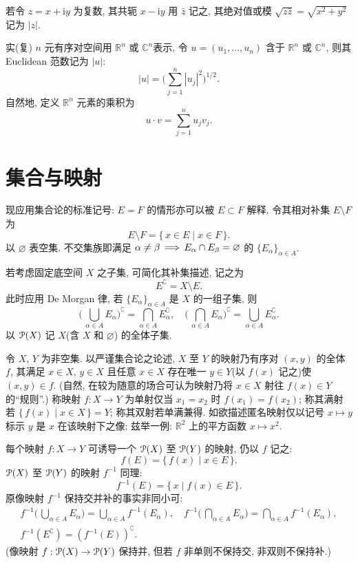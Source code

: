 \documentclass[twoside, fontset=fandol, punct=kaiming]{ctexbook}
\renewcommand\implies{\DOTSB \,\Longrightarrow \,}
\let \mathcal \EuScript
\theoremstyle{innocent}
\begin{document}
若令 $z=x+\mathrm iy$ 为复数, 其共轭 $x-\mathrm iy$ 用 $\bar z$ 记之, 其绝对值或模 $\sqrt{z\bar z} = \sqrt{x^2 + y^2}$ 记为 $|z|$.

实(复) $n$ 元有序对空间用 $\mathbb R^n$ 或 $\mathbb C^n$表示, 令 $u=(u_1,\dots,u_n)$ 含于 $\mathbb R^n$ 或 $\mathbb C^n$, 则其 Euclidean 范数记为 $|u|$:
\[
    |u| = \biggl( \sum_{j=1}^n |u_j|^2 \biggr) ^{1 /2}
    .\]
自然地, 定义 $\mathbb R^n$ 元素的乘积为
\[
    u\cdot v=\sum_{j=1}^n u_j v_j
    .\]
\section{集合与映射}
现应用集合论的标准记号: $E=F$ 的情形亦可以被 $E\subset F$ 解释, 令其相对补集 $E\setminus F$ 为
\[
    E\setminus F = \{\, x\in E \mid x\in F \,\}.
\]
以 $\varnothing$ 表空集. 不交集族即满足 $\alpha \neq \beta \implies E_\alpha\cap E_ \beta =\varnothing$ 的 $\{E_\alpha\}_{\alpha\in A}$.

若考虑固定底空间 $X$ 之子集, 可简化其补集描述, 记之为
\[
    E^\complement  = X\setminus E.
\]
此时应用 De Morgan 律, 若 $\{E_\alpha\}_{\alpha\in A}$ 是 $X$ 的一组子集, 则
\[
    \biggl(\, \bigcup_{\alpha\in A}E_\alpha \biggr)^\complement = \bigcap_{\alpha\in A}E_\alpha^\complement,\quad\biggl(\, \bigcap_{\alpha\in A}E_\alpha \biggr)^\complement = \bigcup_{\alpha\in A}E_\alpha^\complement.
\]
以 $\mathcal P(X)$ 记 $X$(含 $X$ 和 $\varnothing$) 的全体子集.

令 $X$, $Y$ 为非空集. 以严谨集合论之论述, $X$ 至 $Y$ 的映射乃有序对 $(x,y)$ 的全体 $f$, 其满足 $x\in X$, $y\in X$ 且任意 $x\in X$ 存在唯一 $y\in Y$(以 $f(x)$ 记之)使 $(x,y)\in f$. (自然, 在较为随意的场合可认为映射乃将 $x\in X$ 射往 $f(x)\in Y$ 的``规则''.) 称映射 $f:X\to Y$ 为单射仅当 $x_1=x_2$ 时 $f(x_1)=f(x_2)$; 称其满射若 $\{\,f(x)\mid x\in X\,\}=Y$; 称其双射若单满兼得. 如欲描述匿名映射仅以记号 $x\mapsto y$ 标示 $y$ 是 $x$ 在该映射下之像; 兹举一例: $\mathbb R^2$ 上的平方函数 $x\mapsto x^2$.

每个映射 $f:X\to Y$ 可诱导一个 $\mathcal P(X)$ 至 $\mathcal P(Y)$ 的映射, 仍以 $f$ 记之:
\[f(E)=\{\,f(x)\mid x\in E\,\}.\]
$\mathcal P(X)$ 至 $\mathcal P(Y)$ 的映射 $f^{-1} $ 同理:
\[f^{-1} (E) = \{\,x\mid f(x)\in E\,\}.\]
原像映射 $f^{-1} $ 保持交并补的事实非同小可:
\begin{gather*}
    f^{-1} \biggl(\, \bigcup_{\alpha\in A}E_\alpha \biggr)  = \bigcup_{\alpha\in A}f^{-1} (E_\alpha),\quad
    f^{-1} \biggl(\, \bigcap_{\alpha\in A}E_\alpha \biggr)  = \bigcap_{\alpha\in A}f^{-1} (E_\alpha), \\
    f^{-1} (E^\complement)                               = \left( f^{-1} (E) \right)^\complement.
\end{gather*}
(像映射 $f:\mathcal P(X)\to \mathcal P(Y)$ 保持并, 但若 $f$ 非单则不保持交, 非双则不保持补.)
\end{document}
